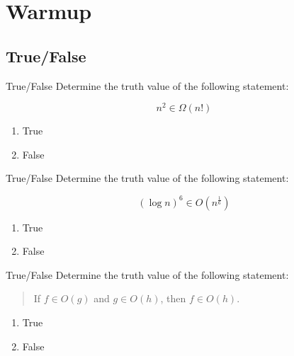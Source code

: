 \documentclass[9pt]{beamer}
\title{\themidterm}
\author{\theauthors}
\institute{\theorganization}
\date{\thedate}
\begin{document}

\begin{frame}
  \titlepage
\end{frame}

\section{Warmup}
\subsection{True/False}
\begin{frame}[fragile]{True/False}
  Determine the truth value of the following statement:

  \[n^2 \in \Omega(n!)\]

  \begin{enumerate}
    \item
      True
    \item
      \alert<2>{False}
  \end{enumerate}
\end{frame}

\begin{frame}[fragile]{True/False}
  Determine the truth value of the following statement:

  \[(\log{n})^{6} \in O(n^{\frac{1}{6}})\]

  \begin{enumerate}
    \item
      \alert<2>{True}
    \item
      False
  \end{enumerate}

\end{frame}

\begin{frame}[fragile]{True/False}
  Determine the truth value of the following statement:

  \begin{quote}
    If $f\in O(g)$ and $g\in O(h)$, then $f\in O(h)$.
  \end{quote}

  \begin{enumerate}
    \item
      \alert<2>{True}
    \item
      False
  \end{enumerate}
\end{frame}
\end{document}
